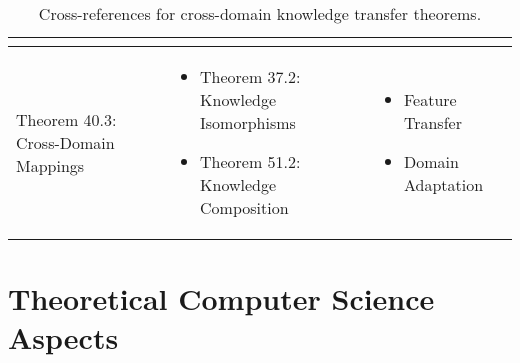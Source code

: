 \begin{table}[h]
\begin{tabular}{|l|p{7cm}|p{4cm}|}
\begin{itemize}
\end{itemize} \\
\hline
Theorem 40.3: Cross-Domain Mappings &
\begin{itemize}
    \item Theorem 37.2: Knowledge Isomorphisms
    \item Theorem 51.2: Knowledge Composition
\end{itemize} &
\begin{itemize}
    \item Feature Transfer
    \item Domain Adaptation
\end{itemize} \\
\hline
\end{tabular}
\caption{Cross-references for cross-domain knowledge transfer theorems.}
\label{tab:xref_transfer}
\end{table}

\section{Theoretical Computer Science Aspects}

